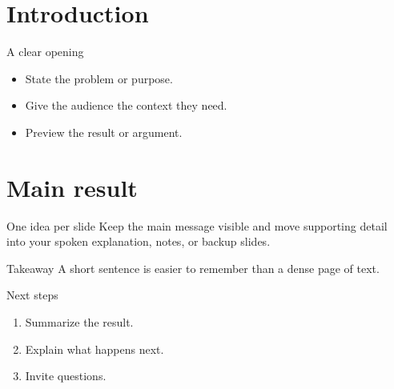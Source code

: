 
\section{Introduction}

\begin{frame}{A clear opening}
  \begin{itemize}
    \item State the problem or purpose.
    \item Give the audience the context they need.
    \item Preview the result or argument.
  \end{itemize}
\end{frame}

\section{Main result}

\begin{frame}{One idea per slide}
  Keep the main message visible and move supporting detail into your spoken
  explanation, notes, or backup slides.

  \begin{block}{Takeaway}
    A short sentence is easier to remember than a dense page of text.
  \end{block}
\end{frame}

\begin{frame}{Next steps}
  \begin{enumerate}
    \item Summarize the result.
    \item Explain what happens next.
    \item Invite questions.
  \end{enumerate}
\end{frame}
